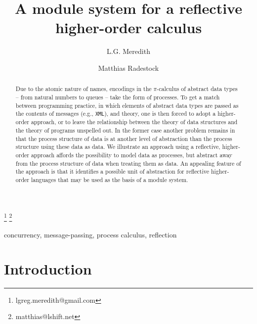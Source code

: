 \documentclass[]{entcs}
\newcommand{\pic}{$\pi$-calculus}
\begin{document}
\begin{frontmatter}
	\title{A module system for a reflective higher-order calculus}

	\author{ L.G. Meredith  }
	\address{ CTO, Djinnisys Corporation\\ 505 N72nd St, Seattle, WA 98103 }
	\author{ Matthias Radestock  }	
	\address{ CTO, LShift, Ltd.\\ 6 Rufus St, London N1 6PE }
	\thanks[lgmemail]{ lgreg.meredith@gmail.com }
	\thanks[mremail]{ matthias@lshift.net }


	\begin{abstract} Due to the atomic nature of names, encodings in
	the {\pic} of abstract data types -- from natural numbers to
	queues -- take the form of processes. To get a match between
	programming practice, in which elements of abstract data types are
	passed as the contents of messages (e.g., \texttt{XML}), and
	theory, one is then forced to adopt a higher-order approach, or to
	leave the relationship between the theory of data structures and
	the theory of programs unspelled out. In the former case another
	problem remains in that the process structure of data is at
	another level of abstraction than the process structure using
	these data as data. We illustrate an approach using a reflective,
	higher-order approach affords the possibility to model data as
	processes, but abstract away from the process structure of data
	when treating them as data. An appealing feature of the approach
	is that it identifies a possible unit of abstraction for
	reflective higher-order languages that may be used as the basis of
	a module system. \end{abstract}

	\begin{keyword}
		concurrency, message-passing, process calculus, reflection
	\end{keyword}

\end{frontmatter}

\section{Introduction}
\end{document}

